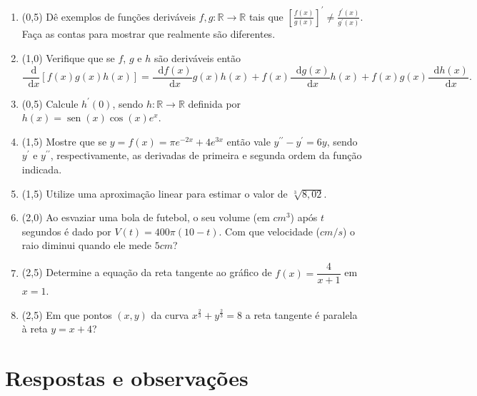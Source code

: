 \documentclass[12pt,a4paper]{article}
\newcommand*\diff{\mathop{}\!\mathrm{d}}
\newcommand*\sen{\operatorname{sen}}
\begin{document}
\begin{enumerate}
\item (0,5) Dê exemplos de funções deriváveis $f, g: \mathbb{R} \to \mathbb{R}$ tais que $\left[\frac{f(x)}{g(x)} \right]^\prime \neq \frac{f^\prime(x) }{ g^\prime(x) }$. Faça as contas para mostrar que realmente são diferentes.

\item (1,0) Verifique que se $f$, $g$ e $h$ são deriváveis então
\[
\frac{ \diff{} }{\diff{x}}\left[f(x) g(x) h(x) \right]
=
  \frac{ \diff{f(x)} }{\diff{x}} g(x) h(x)
+ f(x) \frac{\diff{g(x)} }{\diff{x}} h(x)
+ f(x) g(x) \frac{\diff{h(x)} }{\diff{x}}.
\]
\item (0,5) Calcule $h^\prime(0)$, sendo $h: \mathbb{R} \to \mathbb{R}$ definida por $h(x) = \sen(x) \cos(x) e^x$.

\item (1,5) Mostre que se $y = f(x) = \pi e^{-2x} + 4e^{3x}$ então vale $y^{\prime \prime} - y^\prime = 6 y$, sendo $y^\prime$ e $y^{\prime\prime}$, respectivamente, as derivadas de primeira e segunda ordem da função indicada.

\item (1,5) Utilize uma aproximação linear para estimar o valor de $\sqrt[3]{8,02}$.

\item (2,0) Ao esvaziar uma bola de futebol, o seu volume (em $cm^3$) após $t$ segundos é dado por $V(t) = 400 \pi (10 - t)$. Com que velocidade ($cm/s$) o raio diminui quando ele mede $5cm$?

\item (2,5) Determine a equação da reta tangente ao gráfico de $f(x) = \dfrac{4}{x + 1}$ em $x = 1$.

\item (2,5) Em que pontos $(x,y)$ da curva $ x^\frac{2}{3} + y^\frac{2}{3} = 8$ a reta tangente é paralela à reta $y = x + 4$?

\end{enumerate}

\newpage
\restoregeometry
\section*{Respostas e observações}
\end{document}
